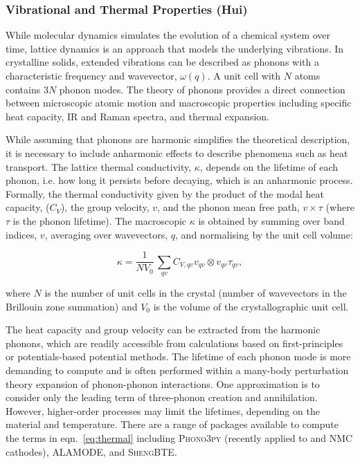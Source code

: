 \documentclass[../main.tex]{subfiles}
\begin{document}
\subsubsection{Vibrational and Thermal Properties (Hui)}
\label{sec:thermal_electronic_vibrational}
While molecular dynamics simulates the evolution of a chemical system over time, lattice dynamics is an approach that models the underlying vibrations. In crystalline solids, extended vibrations can be described as phonons with a characteristic frequency and wavevector, $\omega(q)$. A unit cell with $N$ atoms contains 3$N$ phonon modes. The theory of phonons provides a direct connection between microscopic atomic motion and macroscopic properties including specific heat capacity, IR and Raman spectra, and thermal expansion.\cite{ladd1986lattice, turney2009predicting,seko2015prediction} 

While assuming that phonons are harmonic simplifies the theoretical description, it is necessary to include anharmonic effects to describe phenomena such as heat transport. The lattice thermal conductivity, $\kappa$, depends on the lifetime of each phonon, i.e. how long it persists before decaying, which is an anharmonic process. Formally, the thermal conductivity given by the product of the modal heat capacity, ($C_V$), the group velocity, $v$, and the phonon mean free path, $v \times \tau$ (where $\tau$ is the phonon lifetime). The macroscopic $\kappa$ is obtained by summing over band indices, $v$, averaging over wavevectors, $q$, and normalising by the unit cell volume:

\begin{equation}
    \kappa = \frac{1}{NV_0} \,\sum_{qv} C_{V,qv} v_{qv} \otimes v_{qv} \tau_{qv},
    \label{eq:thermal}
\end{equation}

where $N$ is the number of unit cells in the crystal (number of wavevectors in the Brillouin zone summation) and $V_0$ is the volume of the crystallographic unit cell.

The heat capacity and group velocity can be extracted from the harmonic phonons, which are readily accessible from calculations based on first-principles or potentials-based potential methods. The lifetime of each phonon mode is more demanding to compute and is often performed within a many-body perturbation theory expansion of phonon-phonon interactions. One approximation is to consider only the leading term of three-phonon creation and annihilation. \cite{togo_distributions_2015} However, higher-order processes may limit the lifetimes, depending on the material and temperature. There are a range of packages available to compute the terms in eqn.~\ref{eq:thermal} including \textsc{Phono3py} \cite{togo_distributions_2015} (recently applied to  and NMC cathodes)\cite{yang2019highly,yang2020chemical}, \textsc{ALAMODE}\cite{tadano2014anharmonic}, and \textsc{ShengBTE}\cite{ShengBTE_2014}.

 
\end{document}
